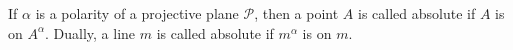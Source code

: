 If $\alpha$ is a polarity of a projective plane $\mathcal{P}$, then a point $A$ is called absolute if $A$ is on $A^\alpha$. Dually, a line $m$ is called absolute if $m^\alpha$ is on $m$.
